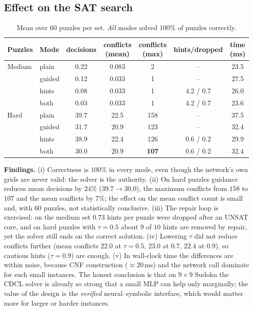 \documentclass[12pt,a4paper]{article}
\begin{document}
\subsection{Effect on the SAT search}
\begin{table}[htbp]\centering\small
\begin{tabular}{@{}llccccc@{}}\toprule
Puzzles & Mode & decisions & conflicts (mean) & conflicts (max) & hints/dropped & time (ms)\\\midrule
Medium & plain & 0.22 & 0.083 & 2 & -- & 23.5\\
 & guided & 0.12 & 0.033 & 1 & -- & 27.5\\
 & hints & 0.08 & 0.033 & 1 & 4.2 / 0.7 & 26.0\\
 & both & 0.03 & 0.033 & 1 & 4.2 / 0.7 & 23.6\\\midrule
Hard & plain & 39.7 & 22.5 & 158 & -- & 37.5\\
 & guided & 31.7 & 20.9 & 123 & -- & 32.4\\
 & hints & 38.9 & 22.4 & 126 & 0.6 / 0.2 & 29.9\\
 & both & 30.0 & 20.9 & \textbf{107} & 0.6 / 0.2 & 32.4\\\bottomrule
\end{tabular}
\caption{Mean over $60$ puzzles per set. \emph{All} modes solved $100\%$ of puzzles correctly.}
\end{table}
\textbf{Findings.} (i) Correctness is $100\%$ in every mode, even though the network's own grids are never valid: the solver is the authority. (ii) On hard puzzles guidance reduces
mean decisions by $24\%$ ($39.7\to30.0$), the maximum conflicts from $158$ to $107$ and the mean conflicts by $7\%$; the effect on the mean conflict count is small and, with $60$ puzzles, not statistically conclusive.
(iii) The repair loop is exercised: on the medium set $0.73$ hints per puzzle were dropped after an UNSAT core, and on hard puzzles with $\tau=0.5$ about $9$ of $10$ hints are removed by repair, yet
the solver still ends on the correct solution. (iv) Lowering $\tau$ did not reduce conflicts further (mean conflicts $22.0$ at $\tau=0.5$, $23.0$ at $0.7$, $22.4$ at $0.9$), so cautious hints ($\tau=0.9$) are enough.
(v) In wall-clock time the differences are within noise, because CNF construction ($\approx20$\,ms) and the network call dominate for such small instances. The honest conclusion is that on $9\times9$ Sudoku
the CDCL solver is already so strong that a small MLP can help only marginally; the value of the design is the \emph{verified} neural--symbolic interface, which would matter more for larger or harder instances.
\end{document}
